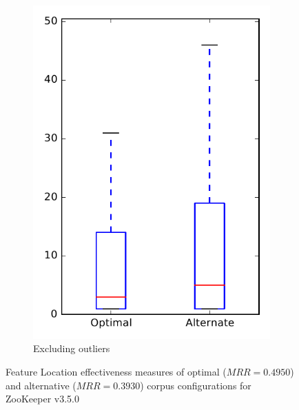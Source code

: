 \begin{figure}
\begin{subfigure}{.4\textwidth}
        \includegraphics[height=0.4\textheight]{figures/combo/flt_rq2_zookeeper_no_outlier}
        \caption{Excluding outliers}\label{fig:combo:flt:rq2:zookeeper_no_outlier}
    \end{subfigure}
\caption[Feature Location effectiveness measures of optimal and alternative corpus configurations for ZooKeeper v3.5.0]%
{Feature Location effectiveness measures of optimal ($MRR=0.4950$) and alternative ($MRR=0.3930$) corpus configurations for ZooKeeper v3.5.0}
\label{fig:combo:flt:rq2:zookeeper}
\end{figure}
